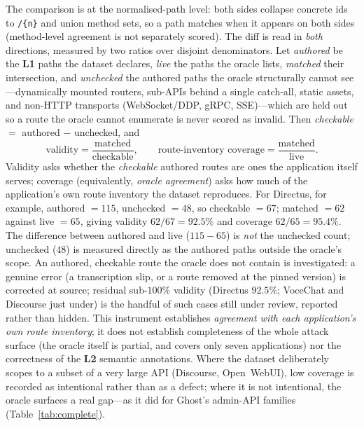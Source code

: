 \documentclass[11pt,a4paper]{article}
\newcommand{\cd}[1]{\lstinline[basicstyle=\ttfamily\small]|#1|}
\renewcommand{\L}[1]{\textbf{L#1}}
\begin{document}
The comparison is at the normalised-path level: both sides collapse concrete ids to
\cd{/{n}} and union method sets, so a path matches when it appears on both sides (method-level
agreement is not separately scored). The diff is read in \emph{both} directions, measured by
two ratios over disjoint denominators. Let \emph{authored} be the \L1 paths the dataset
declares, \emph{live} the paths the oracle lists, \emph{matched} their intersection, and
\emph{unchecked} the authored paths the oracle structurally cannot see---dynamically mounted
routers, sub-APIs behind a single catch-all, static assets, and non-HTTP transports
(WebSocket/DDP, gRPC, SSE)---which are held out so a route the oracle cannot enumerate is
never scored as invalid. Then \emph{checkable} $=$ authored $-$ unchecked, and
\[
\text{validity}=\frac{\text{matched}}{\text{checkable}},\qquad
\text{route-inventory coverage}=\frac{\text{matched}}{\text{live}}.
\]
Validity asks whether the \emph{checkable} authored routes are ones the application itself
serves; coverage (equivalently, \emph{oracle agreement}) asks how much of the application's
own route inventory the dataset reproduces. For Directus, for example, authored $=115$,
unchecked $=48$, so checkable $=67$; matched $=62$ against live $=65$, giving validity
$62/67=92.5\%$ and coverage $62/65=95.4\%$. The difference between authored and live
($115-65$) is \emph{not} the unchecked count; unchecked ($48$) is measured directly as the
authored paths outside the oracle's scope. An authored, checkable route the oracle does not
contain is investigated: a genuine error (a transcription slip, or a route removed at the
pinned version) is corrected at source; residual sub-$100\%$ validity (Directus $92.5\%$;
VoceChat and Discourse just under) is the handful of such cases still under review, reported
rather than hidden. This instrument establishes \emph{agreement with each application's own
route inventory}; it does not establish completeness of the whole attack surface (the oracle
itself is partial, and covers only seven applications) nor the correctness of the \L2 semantic
annotations. Where the dataset deliberately scopes to a subset of a very large API (Discourse,
Open~WebUI), low coverage is recorded as intentional rather than as a defect; where it is not
intentional, the oracle surfaces a real gap---as it did for Ghost's admin-API families
(Table~\ref{tab:complete}).
\end{document}
